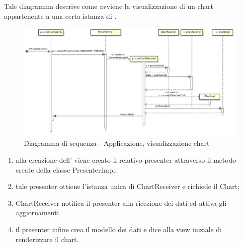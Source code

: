             Tale diagramma descrive come avviene la visualizzazione di un chart appartenente a una certa istanza di .
            \begin{figure}[H]
                \centering
                \includegraphics[scale=0.3]{DefinizioneDiProdotto/Pics/ApplicazioneVisualizzazioneChart}
                \caption{Diagramma di sequenza - Applicazione, visualizzazione chart}
            \end{figure}
            \begin{enumerate}
                \item alla creazione dell' viene creato il relativo presenter attraverso il metodo create della classe PresenterImpl;
                \item tale presenter ottiene l'istanza unica di ChartReceiver e richiede il Chart;
                \item ChartReceiver notifica il presenter alla ricezione dei dati ed attiva gli aggiornamenti.
                \item il presenter infine crea il modello dei dati e dice alla view iniziale di renderizzare il chart.
            \end{enumerate}
            
